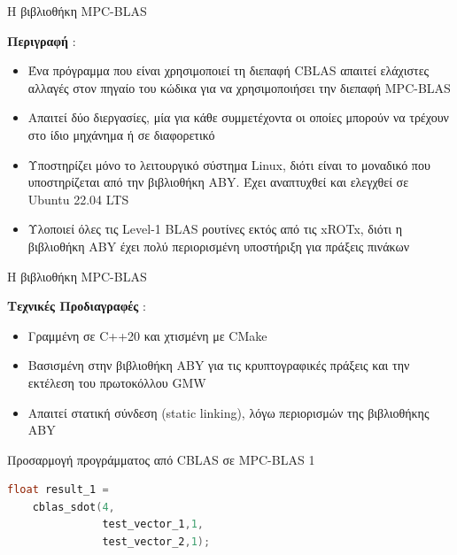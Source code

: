\documentclass[10pt]{beamer}
\begin{document}
    \begin{frame}{Η βιβλιοθήκη MPC-BLAS}
        \begin{block}{}
        \textbf{Περιγραφή} :
        \begin{itemize}
            \item Ένα πρόγραμμα που είναι χρησιμοποιεί τη διεπαφή CBLAS απαιτεί ελάχιστες αλλαγές στον πηγαίο του κώδικα για να χρησιμοποιήσει την διεπαφή MPC-BLAS
            \item Απαιτεί δύο διεργασίες, μία για κάθε συμμετέχοντα οι οποίες μπορούν να τρέχουν στο ίδιο μηχάνημα ή σε διαφορετικό
            \item Υποστηρίζει μόνο το λειτουργικό σύστημα Linux, διότι είναι το μοναδικό που υποστηρίζεται από την βιβλιοθήκη ABY. Έχει αναπτυχθεί και ελεγχθεί σε Ubuntu 22.04 LTS
            \item Υλοποιεί όλες τις Level-1 BLAS ρουτίνες εκτός από τις xROTx, διότι η βιβλιοθήκη ABY έχει πολύ περιορισμένη υποστήριξη για πράξεις πινάκων
        \end{itemize}
            \end{block}
    \end{frame}

    \begin{frame}{Η βιβλιοθήκη MPC-BLAS}
        \begin{block}{}
        \textbf{Τεχνικές Προδιαγραφές} :
        \begin{itemize}
            \item Γραμμένη σε C++20 και χτισμένη με CMake
            \item Βασισμένη στην βιβλιοθήκη ABY για τις κρυπτογραφικές πράξεις και την εκτέλεση του πρωτοκόλλου GMW
            \item Απαιτεί στατική σύνδεση (static linking), λόγω περιορισμών της βιβλιοθήκης ABY
        \end{itemize}
            \end{block}
    \end{frame}

    \begin{frame}[fragile]{Προσαρμογή προγράμματος από CBLAS σε MPC-BLAS 1}
        \begin{block}{}
            \begin{lstlisting}[firstnumber=1, xleftmargin=5pt, basicstyle=\footnotesize, language=C++]
float result_1 =
    cblas_sdot(4,
               test_vector_1,1,
               test_vector_2,1);
            \end{lstlisting}
        \end{block}
    \end{frame}
\end{document}
